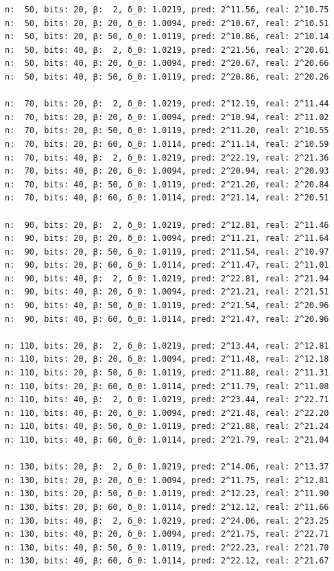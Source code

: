 \documentclass[10pt,a4paper,nobib]{tufte-handout}
\begin{document}
\begin{verbatim}
n:  50, bits: 20, β:  2, δ_0: 1.0219, pred: 2^11.56, real: 2^10.75
n:  50, bits: 20, β: 20, δ_0: 1.0094, pred: 2^10.67, real: 2^10.51
n:  50, bits: 20, β: 50, δ_0: 1.0119, pred: 2^10.86, real: 2^10.14
n:  50, bits: 40, β:  2, δ_0: 1.0219, pred: 2^21.56, real: 2^20.61
n:  50, bits: 40, β: 20, δ_0: 1.0094, pred: 2^20.67, real: 2^20.66
n:  50, bits: 40, β: 50, δ_0: 1.0119, pred: 2^20.86, real: 2^20.26

n:  70, bits: 20, β:  2, δ_0: 1.0219, pred: 2^12.19, real: 2^11.44
n:  70, bits: 20, β: 20, δ_0: 1.0094, pred: 2^10.94, real: 2^11.02
n:  70, bits: 20, β: 50, δ_0: 1.0119, pred: 2^11.20, real: 2^10.55
n:  70, bits: 20, β: 60, δ_0: 1.0114, pred: 2^11.14, real: 2^10.59
n:  70, bits: 40, β:  2, δ_0: 1.0219, pred: 2^22.19, real: 2^21.36
n:  70, bits: 40, β: 20, δ_0: 1.0094, pred: 2^20.94, real: 2^20.93
n:  70, bits: 40, β: 50, δ_0: 1.0119, pred: 2^21.20, real: 2^20.84
n:  70, bits: 40, β: 60, δ_0: 1.0114, pred: 2^21.14, real: 2^20.51

n:  90, bits: 20, β:  2, δ_0: 1.0219, pred: 2^12.81, real: 2^11.46
n:  90, bits: 20, β: 20, δ_0: 1.0094, pred: 2^11.21, real: 2^11.64
n:  90, bits: 20, β: 50, δ_0: 1.0119, pred: 2^11.54, real: 2^10.97
n:  90, bits: 20, β: 60, δ_0: 1.0114, pred: 2^11.47, real: 2^11.01
n:  90, bits: 40, β:  2, δ_0: 1.0219, pred: 2^22.81, real: 2^21.94
n:  90, bits: 40, β: 20, δ_0: 1.0094, pred: 2^21.21, real: 2^21.51
n:  90, bits: 40, β: 50, δ_0: 1.0119, pred: 2^21.54, real: 2^20.96
n:  90, bits: 40, β: 60, δ_0: 1.0114, pred: 2^21.47, real: 2^20.96

n: 110, bits: 20, β:  2, δ_0: 1.0219, pred: 2^13.44, real: 2^12.81
n: 110, bits: 20, β: 20, δ_0: 1.0094, pred: 2^11.48, real: 2^12.18
n: 110, bits: 20, β: 50, δ_0: 1.0119, pred: 2^11.88, real: 2^11.31
n: 110, bits: 20, β: 60, δ_0: 1.0114, pred: 2^11.79, real: 2^11.08
n: 110, bits: 40, β:  2, δ_0: 1.0219, pred: 2^23.44, real: 2^22.71
n: 110, bits: 40, β: 20, δ_0: 1.0094, pred: 2^21.48, real: 2^22.20
n: 110, bits: 40, β: 50, δ_0: 1.0119, pred: 2^21.88, real: 2^21.24
n: 110, bits: 40, β: 60, δ_0: 1.0114, pred: 2^21.79, real: 2^21.04

n: 130, bits: 20, β:  2, δ_0: 1.0219, pred: 2^14.06, real: 2^13.37
n: 130, bits: 20, β: 20, δ_0: 1.0094, pred: 2^11.75, real: 2^12.81
n: 130, bits: 20, β: 50, δ_0: 1.0119, pred: 2^12.23, real: 2^11.90
n: 130, bits: 20, β: 60, δ_0: 1.0114, pred: 2^12.12, real: 2^11.66
n: 130, bits: 40, β:  2, δ_0: 1.0219, pred: 2^24.06, real: 2^23.25
n: 130, bits: 40, β: 20, δ_0: 1.0094, pred: 2^21.75, real: 2^22.71
n: 130, bits: 40, β: 50, δ_0: 1.0119, pred: 2^22.23, real: 2^21.70
n: 130, bits: 40, β: 60, δ_0: 1.0114, pred: 2^22.12, real: 2^21.67
\end{verbatim}
\end{document}
